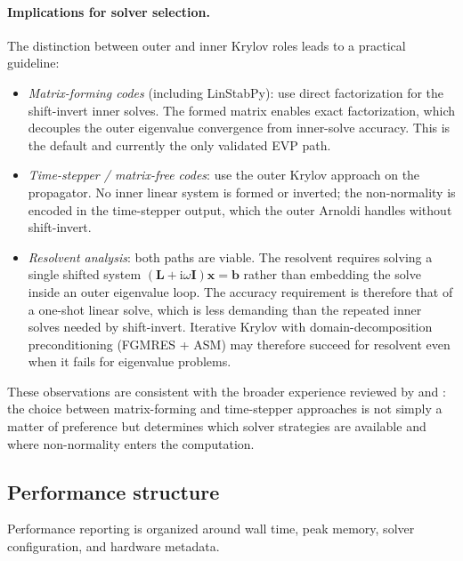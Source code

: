 \documentclass[11pt]{article}
\newcommand{\bx}{\mathbf{x}}
\newcommand{\bI}{\mathbf{I}}
\newcommand{\bL}{\mathbf{L}}
\newcommand{\bb}{\mathbf{b}}
\begin{document}
\paragraph{Implications for solver selection.}
The distinction between outer and inner Krylov roles leads to a practical
guideline:
\begin{itemize}[nosep]
\item \emph{Matrix-forming codes} (including LinStabPy): use direct
  factorization for the shift-invert inner solves. The formed matrix enables
  exact factorization, which decouples the outer eigenvalue convergence from
  inner-solve accuracy. This is the default and currently the only validated
  EVP path.
\item \emph{Time-stepper / matrix-free codes}: use the outer Krylov approach
  on the propagator. No inner linear system is formed or inverted; the
  non-normality is encoded in the time-stepper output, which the outer
  Arnoldi handles without shift-invert.
\item \emph{Resolvent analysis}: both paths are viable. The resolvent requires
  solving a single shifted system $(\bL + \mathrm{i}\omega\bI)\bx = \bb$
  rather than embedding the solve inside an outer eigenvalue loop. The
  accuracy requirement is therefore that of a one-shot linear solve, which is
  less demanding than the repeated inner solves needed by shift-invert.
  Iterative Krylov with domain-decomposition preconditioning (FGMRES + ASM)
  may therefore succeed for resolvent even when it fails for eigenvalue
  problems.
\end{itemize}
These observations are consistent with the broader experience reviewed by
\citet{theofilis2011global} and \citet{frantz2023krylov}: the choice between
matrix-forming and time-stepper approaches is not simply a matter of
preference but determines which solver strategies are available and where
non-normality enters the computation.

\subsection{Performance structure}
\label{sec:scaling}

Performance reporting is organized around wall time, peak memory, solver
configuration, and hardware metadata.
\end{document}
